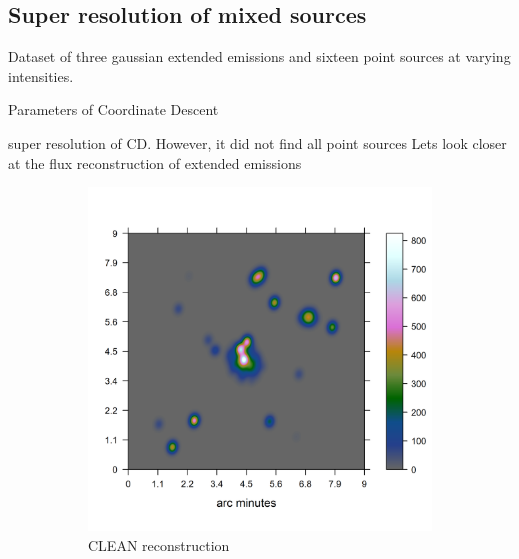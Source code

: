 
\subsection{Super resolution of mixed sources}

Dataset of three gaussian extended emissions and sixteen point sources at varying intensities.

Parameters of Coordinate Descent

super resolution of CD. However, it did not find all point sources
Lets look closer at the flux reconstruction of extended emissions

\begin{figure}[h]
	\centering
	\begin{subfigure}[b]{0.4\linewidth}
		\includegraphics[width=\linewidth, trim={0.2in, 0.2in, 0, 0.2in}, clip]{./chapters/20.results/mixed/mixed_clean.png}
		\caption{CLEAN reconstruction}
		\label{results:mixed:tclean}
	\end{subfigure}
	\begin{subfigure}[b]{0.4\linewidth}

\end{subfigure}
\end{figure}
